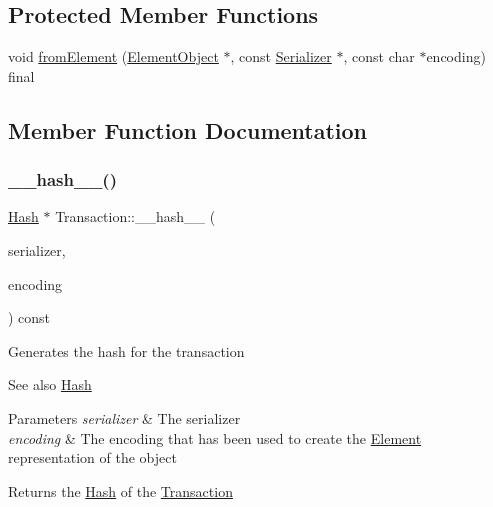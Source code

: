 \subsection*{Protected Member Functions}
\begin{DoxyCompactItemize}
\item 
void \mbox{\hyperlink{classReward_a6d16e21b60b7f11c7aaf0098a53118a2}{from\+Element}} (\mbox{\hyperlink{classElementObject}{Element\+Object}} $\ast$, const \mbox{\hyperlink{classSerializer}{Serializer}} $\ast$, const char $\ast$encoding) final
\end{DoxyCompactItemize}


\subsection{Member Function Documentation}
\mbox{\label{classTransaction_a1f0df166c34d6a38a991544cf98c0356}} 
\subsubsection{\texorpdfstring{\+\_\+\+\_\+hash\+\_\+\+\_\+()}{\_\_hash\_\_()}}
{\footnotesize\ttfamily \mbox{\hyperlink{classHash}{Hash}} $\ast$ Transaction\+::\+\_\+\+\_\+hash\+\_\+\+\_\+ (\begin{DoxyParamCaption}\item[{const \mbox{\hyperlink{classSerializer}{Serializer}} $\ast$}]{serializer,  }\item[{const char $\ast$}]{encoding }\end{DoxyParamCaption}) const\hspace{0.3cm}{\ttfamily [inherited]}}

Generates the hash for the transaction \begin{DoxySeeAlso}{See also}
\mbox{\hyperlink{classHash}{Hash}}
\end{DoxySeeAlso}

\begin{DoxyParams}{Parameters}
{\em serializer} & The serializer \\
\hline
{\em encoding} & The encoding that has been used to create the \mbox{\hyperlink{classElement}{Element}} representation of the object \\
\hline
\end{DoxyParams}
\begin{DoxyReturn}{Returns}
the \mbox{\hyperlink{classHash}{Hash}} of the \mbox{\hyperlink{classTransaction}{Transaction}} 
\end{DoxyReturn}
\mbox{\label{classComponent_a28212595f8ee85fe009bd233bc99b2fc}} 
